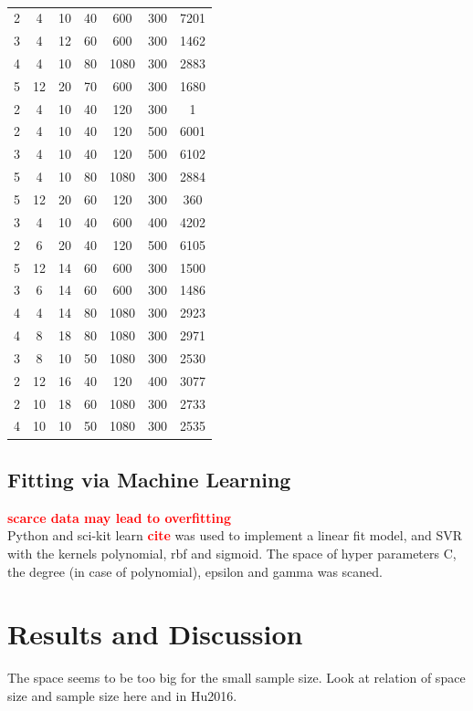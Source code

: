 \documentclass[a4paper]{article}
\newcommand{\td}[1]{\textbf{\textcolor{red}{#1}}}
\begin{document}
\begin{table}[htb]
\begin{tabular}{ccccccc}
2	&4	&10	&40	&600	&300	&7201	\\
3	&4	&12	&60	&600	&300	&1462	\\
4	&4	&10	&80	&1080	&300	&2883	\\
5	&12	&20	&70	&600	&300	&1680	\\
		\hline
2	&4	&10	&40	&120	&300	&1	\\
2	&4	&10	&40	&120	&500	&6001	\\
3	&4	&10	&40	&120	&500	&6102	\\
5	&4	&10	&80	&1080	&300	&2884	\\
5	&12	&20	&60	&120	&300	&360	\\
		\hline
3	&4	&10	&40	&600	&400	&4202	\\
2	&6	&20	&40	&120	&500	&6105	\\
5	&12	&14	&60	&600	&300	&1500	\\
3	&6	&14	&60	&600	&300	&1486	\\
4	&4	&14	&80	&1080	&300	&2923	\\
		\hline
4	&8	&18	&80	&1080	&300	&2971	\\
3	&8	&10	&50	&1080	&300	&2530	\\
2	&12	&16	&40	&120	&400	&3077	\\
2	&10	&18	&60	&1080	&300	&2733	\\
4	&10	&10	&50	&1080	&300	&2535	\\
		\hline
		\hline
	\end{tabular}
	\caption{}
	\label{tab:emma}
\end{table}



\subsection{Fitting via Machine Learning}
\td{scarce data may lead to overfitting\cite{Lecun1995conv}}\\
Python and sci-kit learn \td{cite} was used to implement a linear fit model, and SVR with the kernels polynomial, rbf and sigmoid. 
The space of hyper parameters C, the degree (in case of polynomial), epsilon and gamma was scaned. 


\clearpage
\section{Results and Discussion}
The space seems to be too big for the small sample size.
Look at relation of space size and sample size here and in Hu2016.
\end{document}

